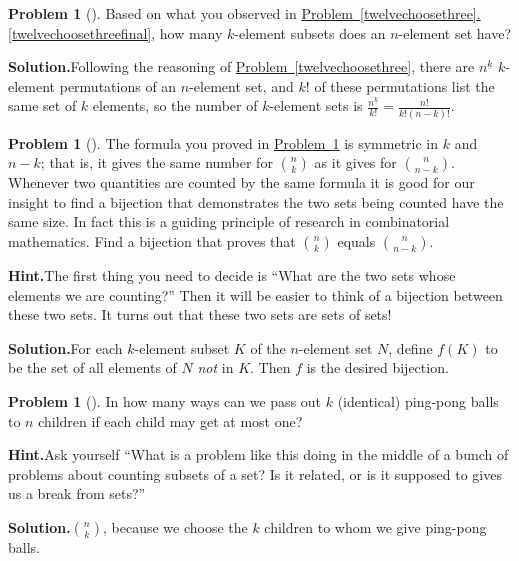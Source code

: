 \documentclass[10pt,]{book}
\theoremstyle{plain}
\theoremstyle{definition}
\newtheorem{activity}[project]{Problem}
\theoremstyle{definition}
\numberwithin{equation}{chapter}
\begin{document}
\begin{activity}[]\label{nchoosek}
Based on what you observed in \hyperref[twelvechoosethreefinal]{Problem~\ref{twelvechoosethree}.\ref{twelvechoosethreefinal}}, how many \(k\)-element subsets does an \(n\)-element set have?%
\par\medskip\noindent%
\textbf{Solution.}\quad Following the reasoning of \hyperref[twelvechoosethree]{Problem~\ref{twelvechoosethree}}, there are \(n^{\underline{k}}\) \(k\)-element permutations of an \(n\)-element set, and \(k!\) of these permutations list the same set of \(k\) elements, so the number of \(k\)-element sets is \(\frac{n^{\underline{k}}}{ k!}= \frac{n!}{k!(n-k)!}\).%
\end{activity}
\begin{activity}[]\label{activity-36}
The formula you proved in \hyperref[nchoosek]{Problem~\ref{nchoosek}} is symmetric in \(k\) and \(n-k\); that is, it gives the same number for \(\binom{n}{k}\) as it gives for \(\binom{n}{n-k}\). Whenever two quantities are counted by the same formula it is good for our insight to find a bijection that demonstrates the two sets being counted have the same size. In fact this is a guiding principle of research in combinatorial mathematics. Find a bijection that proves that \(\binom{n}{k}\) equals \(\binom{n}{n-k}\).%
\par\medskip\noindent%
\textbf{Hint.}\quad The first thing you need to decide is ``What are the two sets whose elements we are counting?'' Then it will be easier to think of a bijection between these two sets. It turns out that these two sets are sets of sets!%
\par\medskip\noindent%
\textbf{Solution.}\quad For each \(k\)-element subset \(K\) of the \(n\)-element set \(N\), define \(f(K)\) to be the set of all elements of \(N\) \emph{not} in \(K\). Then \(f\) is the desired bijection.%
\end{activity}
\begin{activity}[]\label{ping-pong}
In how many ways can we pass out \(k\) (identical) ping-pong balls to \(n\) children if each child may get at most one?%
\par\medskip\noindent%
\textbf{Hint.}\quad Ask yourself ``What is a problem like this doing in the middle of a bunch of problems about counting subsets of a set? Is it related, or is it supposed to gives us a break from sets?''%
\par\medskip\noindent%
\textbf{Solution.}\quad \(\binom{n}{k}\), because we choose the \(k\) children to whom we give ping-pong balls.%
\end{activity}
\end{document}
